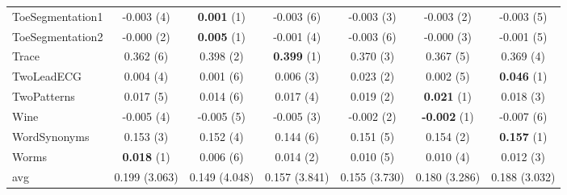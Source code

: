 \begin{table}[ht]
\begin{adjustbox}{width=\textwidth}
\begin{tabular}{lcccccc}
ToeSegmentation1 & -0.003 (4) & \textbf{0.001} (1) & -0.003 (6) & -0.003 (3) & -0.003 (2) & -0.003 (5) \\
ToeSegmentation2 & -0.000 (2) & \textbf{0.005} (1) & -0.001 (4) & -0.003 (6) & -0.000 (3) & -0.001 (5) \\
Trace & 0.362 (6) & 0.398 (2) & \textbf{0.399} (1) & 0.370 (3) & 0.367 (5) & 0.369 (4) \\
TwoLeadECG & 0.004 (4) & 0.001 (6) & 0.006 (3) & 0.023 (2) & 0.002 (5) & \textbf{0.046} (1) \\
TwoPatterns & 0.017 (5) & 0.014 (6) & 0.017 (4) & 0.019 (2) & \textbf{0.021} (1) & 0.018 (3) \\
Wine & -0.005 (4) & -0.005 (5) & -0.005 (3) & -0.002 (2) & \textbf{-0.002} (1) & -0.007 (6) \\
WordSynonyms & 0.153 (3) & 0.152 (4) & 0.144 (6) & 0.151 (5) & 0.154 (2) & \textbf{0.157} (1) \\
Worms & \textbf{0.018} (1) & 0.006 (6) & 0.014 (2) & 0.010 (5) & 0.010 (4) & 0.012 (3) \\
\hline 
avg & 0.199 (3.063) & 0.149 (4.048) & 0.157 (3.841) & 0.155 (3.730) & 0.180 (3.286) & 0.188 (3.032) \\ 
\hline
\end{tabular}
\end{adjustbox}
\end{table}


